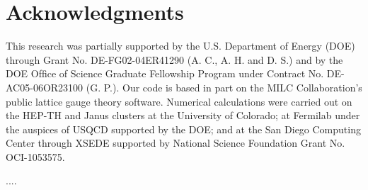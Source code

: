 \documentclass{PoS}
\begin{document}
\section{Acknowledgments}
\label{sec:acknowledgments}
This research was partially supported by the U.S. Department of Energy (DOE) through Grant No. DE-FG02-04ER41290 (A. C., A. H. and D. S.) and by the DOE Ofﬁce of Science Graduate Fellowship Program under Contract No. DE-AC05-06OR23100 (G. P.). 
Our code is based in part on the MILC Collaboration’s public lattice gauge theory software.
Numerical calculations were carried out on the HEP-TH and Janus clusters at the University of Colorado; at Fermilab under the auspices of USQCD supported by the DOE; and at the San Diego Computing Center through XSEDE supported by National Science Foundation Grant No. OCI-1053575.

\begin{thebibliography}{99}
....

\end{thebibliography}
\end{document}
